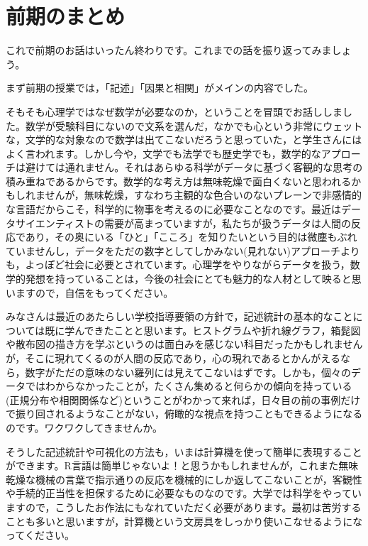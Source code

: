 \documentclass{ltjbook}
\begin{document}
\chapter{前期のまとめ}
\label{chapter15}
これで前期のお話はいったん終わりです。これまでの話を振り返ってみましょう。

まず前期の授業では，「記述」「因果と相関」がメインの内容でした。

そもそも心理学ではなぜ数学が必要なのか，ということを冒頭でお話ししました。数学が受験科目にないので文系を選んだ，なかでも心という非常にウェットな，文学的な対象なので数学は出てこないだろうと思っていた，と学生さんにはよく言われます。しかし今や，文学でも法学でも歴史学でも，数学的なアプローチは避けては通れません。それはあらゆる科学がデータに基づく客観的な思考の積み重ねであるからです。数学的な考え方は無味乾燥で面白くないと思われるかもしれませんが，無味乾燥，すなわち主観的な色合いのないプレーンで非感情的な言語だからこそ，科学的に物事を考えるのに必要なことなのです。最近はデータサイエンティストの需要が高まっていますが，私たちが扱うデータは人間の反応であり，その奥にいる「ひと」「こころ」を知りたいという目的は微塵もぶれていませんし，データをただの数字としてしかみない(見れない)アプローチよりも，よっぽど社会に必要とされています。心理学をやりながらデータを扱う，数学的発想を持っていることは，今後の社会にとても魅力的な人材として映ると思いますので，自信をもってください。

みなさんは最近のあたらしい学校指導要領の方針で，記述統計の基本的なことについては既に学んできたことと思います。ヒストグラムや折れ線グラフ，箱髭図や散布図の描き方を学ぶというのは面白みを感じない科目だったかもしれませんが，そこに現れてくるのが人間の反応であり，心の現れであるとかんがえるなら，数字がただの意味のない羅列には見えてこないはずです。しかも，個々のデータではわからなかったことが，たくさん集めると何らかの傾向を持っている(正規分布や相関関係など)ということがわかって来れば，日々目の前の事例だけで振り回されるようなことがない，俯瞰的な視点を持つこともできるようになるのです。ワクワクしてきませんか。

そうした記述統計や可視化の方法も，いまは計算機を使って簡単に表現することができます。R言語は簡単じゃないよ！と思うかもしれませんが，これまた無味乾燥な機械の言葉で指示通りの反応を機械的にしか返してこないことが，客観性や手続的正当性を担保するために必要なものなのです。大学では科学をやっていますので，こうしたお作法にもなれていただく必要があります。最初は苦労することも多いと思いますが，計算機という文房具をしっかり使いこなせるようになってください。
\end{document}
